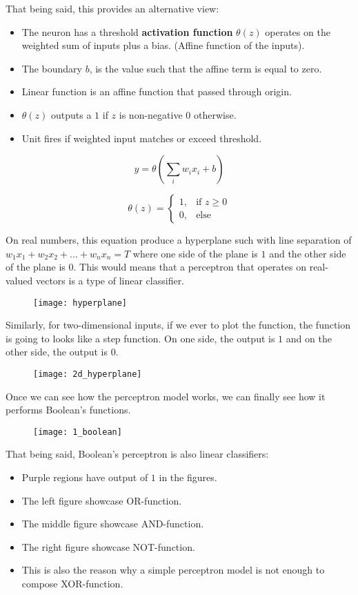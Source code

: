 \hfill\break
That being said, this provides an alternative view:
\begin{itemize}
	\item The neuron has a threshold \textbf{activation function} $\theta (z)$ operates on the weighted sum of inputs plus a bias. (Affine function of the inputs).
	\item The boundary $b$, is the value such that the affine term is equal to zero.
	\item Linear function is an affine function that passed through origin.
	\item $\theta (z)$ outputs a $1$ if $z$ is non-negative $0$ otherwise.
	\item Unit fires if weighted input matches or exceed threshold.
\end{itemize}
\[ 
y = \theta \left( \sum_{i}w_ix_i + b 																								\right)
\]

\[ 
\theta(z) = 
\begin{cases} 
	1, & \text{if } z \geq 0 \\
	0, & \text{else }
\end{cases}
\]

\hfill\break
On real numbers, this equation produce a hyperplane such with line separation of $w_1x_1 + w_2x_2 + ... + w_nx_n = T$ where one side of the plane is $1$ and the other side of the plane is $0$. This would means that a perceptron that operates on real-valued vectors is a type of linear classifier.

\begin{figure}[H]
	\centering
	\texttt{[image: hyperplane]}
\end{figure}

\hfill\break
Similarly, for two-dimensional inputs, if we ever to plot the function, the function is going to looks like a step function. On one side, the output is $1$ and on the other side, the output is $0$.

\begin{figure}[H]
	\centering
	\texttt{[image: 2d\_hyperplane]}
\end{figure}

\hfill\break
Once we can see how the perceptron model works, we can finally see how it performs Boolean's functions.

\begin{figure}[H]
	\centering
	\texttt{[image: 1\_boolean]}
\end{figure}

\hfill\break
That being said, Boolean's perceptron is also linear classifiers:
\begin{itemize}
	\item Purple regions have output of $1$ in the figures.
	\item The left figure showcase OR-function.
	\item The middle figure showcase AND-function.
	\item The right figure showcase NOT-function.
	\item This is also the reason why a simple perceptron model is not enough to compose XOR-function.
\end{itemize}

